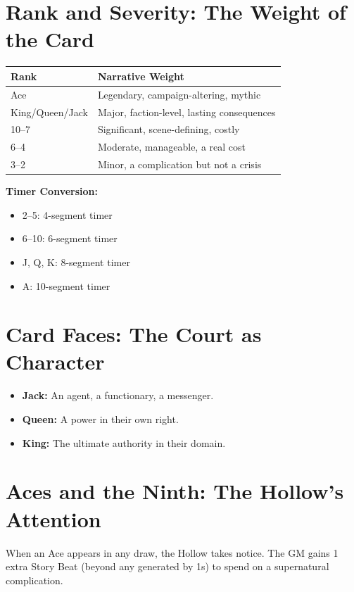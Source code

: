 \documentclass[12pt,oneside]{book}
\begin{document}
\section*{Rank and Severity: The Weight of the Card}

\begin{center}
\begin{tabular}{|l|l|}
\hline
\textbf{Rank} & \textbf{Narrative Weight} \\
\hline
Ace & Legendary, campaign-altering, mythic \\
King/Queen/Jack & Major, faction-level, lasting consequences \\
10--7 & Significant, scene-defining, costly \\
6--4 & Moderate, manageable, a real cost \\
3--2 & Minor, a complication but not a crisis \\
\hline
\end{tabular}
\end{center}

\noindent
\textbf{Timer Conversion:}
\begin{itemize}
    \item 2--5: 4-segment timer
    \item 6--10: 6-segment timer
    \item J, Q, K: 8-segment timer
    \item A: 10-segment timer
\end{itemize}

\section*{Card Faces: The Court as Character}

\begin{itemize}
    \item \textbf{Jack:} An agent, a functionary, a messenger.
    \item \textbf{Queen:} A power in their own right.
    \item \textbf{King:} The ultimate authority in their domain.
\end{itemize}

\section*{Aces and the Ninth: The Hollow's Attention}

When an Ace appears in any draw, the Hollow takes notice. The GM gains 1 extra Story Beat (beyond any generated by 1s) to spend on a supernatural complication.
\end{document}
